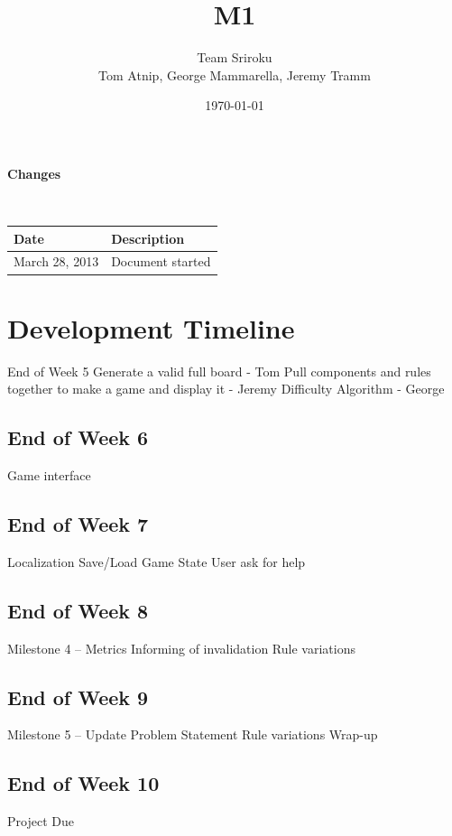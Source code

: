 \documentclass{article}
\begin{document}
\setlength{\voffset}{3.5in}
\title{M1}
\author{\Large Team Sriroku\\
Tom Atnip, George Mammarella, Jeremy Tramm}
\date{\today}
\maketitle
\clearpage
\setlength{\voffset}{0pt}
\tableofcontents
\clearpage


\begin{Large}
\textbf{Changes}
\end{Large}
\\

\begin{tabular}{ | p{1.5in} | p{4.5in} | }
\hline
\textbf{Date} & \textbf{Description}\\
\hline
\hline
March 28, 2013 & Document started\\
\hline
\end{tabular}
\clearpage

\section{Development Timeline}
End of Week 5
Generate a valid full board - Tom
Pull components and rules together to make a game and display it - Jeremy
Difficulty Algorithm - George

\subsection{End of Week 6}
Game interface

\subsection{End of  Week 7}
Localization
Save/Load Game State
User ask for help

\subsection{End of Week 8}
Milestone 4 – Metrics
Informing of invalidation
Rule variations

\subsection{End of Week 9}
Milestone 5 – Update Problem Statement
Rule variations
Wrap-up

\subsection{End of Week 10}
Project Due
\end{document}
